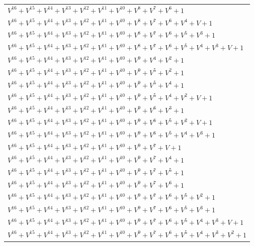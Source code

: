 \documentclass[12pt]{article}
\begin{document}
\begin{adjustwidth}{-4cm}{}
\begin{center}
\begin{longtable}{|l|}
$V^{16}  +V^{15}  +V^{14}  +V^{13}  +V^{12}  +V^{11}  +V^{10}  +V^{8}  +V^{7}  +V^{6}  + 1$ \\
$V^{16}  +V^{15}  +V^{14}  +V^{13}  +V^{12}  +V^{11}  +V^{10}  +V^{8}  +V^{7}  +V^{6}  +V^{4}  + V + 1$ \\
$V^{16}  +V^{15}  +V^{14}  +V^{13}  +V^{12}  +V^{11}  +V^{10}  +V^{8}  +V^{7}  +V^{6}  +V^{5}  +V^{3}  + 1$ \\
$V^{16}  +V^{15}  +V^{14}  +V^{13}  +V^{12}  +V^{11}  +V^{10}  +V^{8}  +V^{7}  +V^{6}  +V^{5}  +V^{4}  +V^{3}  + V + 1$ \\
$V^{16}  +V^{15}  +V^{14}  +V^{13}  +V^{12}  +V^{11}  +V^{10}  +V^{9}  +V^{4}  +V^{2}  + 1$ \\
$V^{16}  +V^{15}  +V^{14}  +V^{13}  +V^{12}  +V^{11}  +V^{10}  +V^{9}  +V^{5}  +V^{2}  + 1$ \\
$V^{16}  +V^{15}  +V^{14}  +V^{13}  +V^{12}  +V^{11}  +V^{10}  +V^{9}  +V^{5}  +V^{4}  + 1$ \\
$V^{16}  +V^{15}  +V^{14}  +V^{13}  +V^{12}  +V^{11}  +V^{10}  +V^{9}  +V^{5}  +V^{4}  +V^{2}  + V + 1$ \\
$V^{16}  +V^{15}  +V^{14}  +V^{13}  +V^{12}  +V^{11}  +V^{10}  +V^{9}  +V^{6}  +V^{3}  + 1$ \\
$V^{16}  +V^{15}  +V^{14}  +V^{13}  +V^{12}  +V^{11}  +V^{10}  +V^{9}  +V^{6}  +V^{5}  +V^{2}  + V + 1$ \\
$V^{16}  +V^{15}  +V^{14}  +V^{13}  +V^{12}  +V^{11}  +V^{10}  +V^{9}  +V^{6}  +V^{5}  +V^{4}  +V^{3}  + 1$ \\
$V^{16}  +V^{15}  +V^{14}  +V^{13}  +V^{12}  +V^{11}  +V^{10}  +V^{9}  +V^{7}  + V + 1$ \\
$V^{16}  +V^{15}  +V^{14}  +V^{13}  +V^{12}  +V^{11}  +V^{10}  +V^{9}  +V^{7}  +V^{4}  + 1$ \\
$V^{16}  +V^{15}  +V^{14}  +V^{13}  +V^{12}  +V^{11}  +V^{10}  +V^{9}  +V^{7}  +V^{5}  + 1$ \\
$V^{16}  +V^{15}  +V^{14}  +V^{13}  +V^{12}  +V^{11}  +V^{10}  +V^{9}  +V^{7}  +V^{6}  + 1$ \\
$V^{16}  +V^{15}  +V^{14}  +V^{13}  +V^{12}  +V^{11}  +V^{10}  +V^{9}  +V^{7}  +V^{6}  +V^{5}  +V^{2}  + 1$ \\
$V^{16}  +V^{15}  +V^{14}  +V^{13}  +V^{12}  +V^{11}  +V^{10}  +V^{9}  +V^{7}  +V^{6}  +V^{5}  +V^{3}  + 1$ \\
$V^{16}  +V^{15}  +V^{14}  +V^{13}  +V^{12}  +V^{11}  +V^{10}  +V^{9}  +V^{7}  +V^{6}  +V^{5}  +V^{4}  +V^{3}  + V + 1$ \\
$V^{16}  +V^{15}  +V^{14}  +V^{13}  +V^{12}  +V^{11}  +V^{10}  +V^{9}  +V^{7}  +V^{6}  +V^{5}  +V^{4}  +V^{3}  +V^{2}  + 1$ \\

\end{longtable}
\end{center}
\end{adjustwidth}
\end{document}
